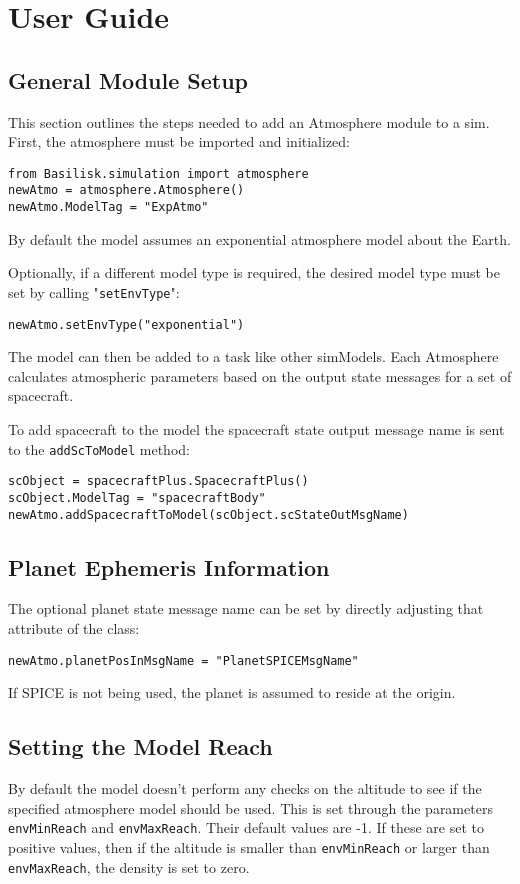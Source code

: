 
\section{User Guide}

\subsection{General Module Setup}
This section outlines the steps needed to add an Atmosphere module to a sim.
First, the atmosphere must be imported and initialized:
\begin{verbatim}
from Basilisk.simulation import atmosphere
newAtmo = atmosphere.Atmosphere()
newAtmo.ModelTag = "ExpAtmo"
\end{verbatim}
By default the model assumes an exponential atmosphere model about the Earth.

Optionally, if a different model type is required, the desired model type must be set by calling "\verb|setEnvType|":
\begin{verbatim}
newAtmo.setEnvType("exponential")
\end{verbatim}

The model can then be added to a task like other simModels. Each Atmosphere calculates atmospheric parameters based on the output state messages for a set of spacecraft.

To add spacecraft to the model the spacecraft state output message name is sent to the \verb|addScToModel| method:
\begin{verbatim}
scObject = spacecraftPlus.SpacecraftPlus()
scObject.ModelTag = "spacecraftBody"
newAtmo.addSpacecraftToModel(scObject.scStateOutMsgName)
\end{verbatim}

\subsection{Planet Ephemeris Information}
The optional planet state message name can be set by directly adjusting that attribute of the class:
\begin{verbatim}
newAtmo.planetPosInMsgName = "PlanetSPICEMsgName"
\end{verbatim}
If SPICE is not being used, the planet is assumed to reside at the origin.

\subsection{Setting the Model Reach}
By default the model doesn't perform any checks on the altitude to see if the specified atmosphere model should be used.  This is set through the parameters {\tt envMinReach} and {\tt envMaxReach}.  Their default values are -1.  If these are set to positive values, then if the altitude is smaller than {\tt envMinReach} or larger than {\tt envMaxReach}, the density is set to zero.


